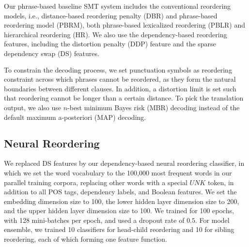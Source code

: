 \documentclass[letterpaper]{article}
\begin{document}
Our phrase-based baseline SMT system includes the conventional reordering models, i.e., distance-based reordering penalty (DBR) and phrase-based reordering model (PBRM), both phrase-based lexicalized reordering (PBLR) and hierarchical reordering (HR). We also use the dependency-based reordering features, including the distortion penalty (DDP) feature and the sparse dependency swap (DS) features.

To constrain the decoding process, we set punctuation symbols as reordering constraint across which phrases cannot be reordered, as they form the natural boundaries between different clauses. In addition, a distortion limit is set such that reordering cannot be longer than a certain distance. To pick the translation output, we also use $n$-best minimum Bayes risk (MBR) decoding \cite{kumar_minimum_2004} instead of the default maximum a-posteriori (MAP) decoding.

\subsection{Neural Reordering}

We replaced DS features by our dependency-based neural reordering classifier, in which we set the word vocabulary to the 100,000 most frequent words in our parallel training corpora, replacing other words with a special $UNK$ token, in addition to all POS tags, dependency labels, and Boolean features. We set the embedding dimension size to 100, the lower hidden layer dimension size to 200, and the upper hidden layer dimension size to 100. We trained for 100 epochs, with 128 mini-batches per epoch, and used a dropout rate of $0.5$. For model ensemble, we trained 10 classifiers for head-child reordering and 10 for sibling reordering, each of which forming one feature function.
\end{document}
